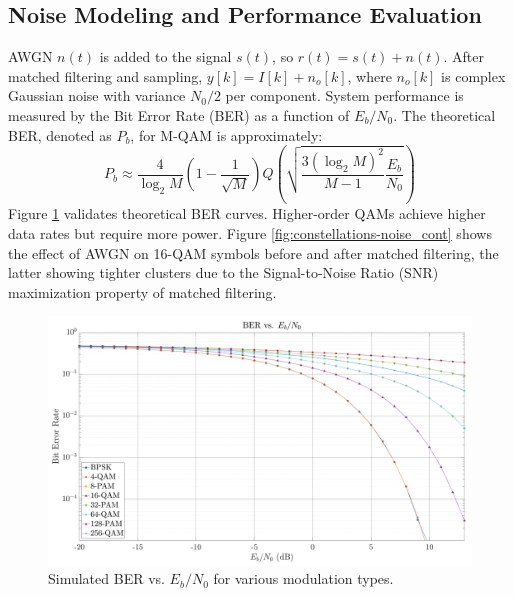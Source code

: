 \documentclass[11pt]{article}
\begin{document}
	\subsection{Noise Modeling and Performance Evaluation}
	AWGN $n(t)$ is added to the signal $s(t)$, so $r(t) = s(t) + n(t)$. After matched filtering and sampling, $y[k] = I[k] + n_o[k]$, where $n_o[k]$ is complex Gaussian noise with variance $N_0/2$ per component. System performance is measured by the Bit Error Rate (BER) as a function of $E_b/N_0$. The theoretical BER, denoted as $P_b$, for M-QAM is approximately:
	\begin{equation}
		P_b \approx \frac{4}{\log_2 M} \left(1 - \frac{1}{\sqrt{M}}\right) Q\left(\sqrt{\frac{3 (\log_2 M)^2}{M-1} \frac{E_b}{N_0}}\right)
	\end{equation}
	Figure \ref{fig:ber-mod_cont} validates theoretical BER curves. Higher-order QAMs achieve higher data rates but require more power. Figure \ref{fig:constellations-noise_cont} shows the effect of AWGN on 16-QAM symbols before and after matched filtering, the latter showing tighter clusters due to the Signal-to-Noise Ratio (SNR) maximization property of matched filtering.
	
	\begin{figure}[H]
		\centering
		\includegraphics[width=0.7\linewidth]{Images/ber-mod.png}
		\caption{Simulated BER vs. $E_b/N_0$ for various modulation types.}
		\label{fig:ber-mod_cont}
	\end{figure}
	
\end{document}
